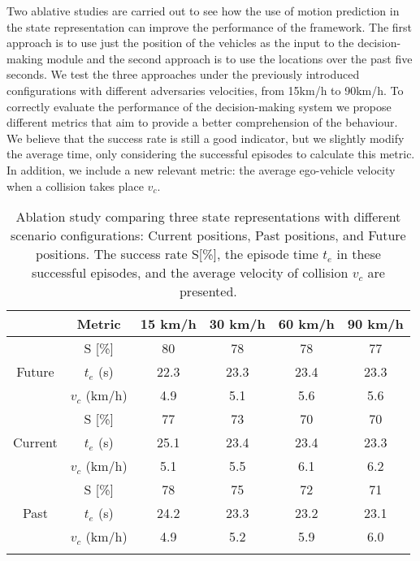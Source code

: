 Two ablative studies are carried out to see how the use of motion prediction in the state representation can improve the performance of the framework. The first approach is to use just the position of the vehicles as the input to the decision-making module and the second approach is to use the locations over the past five seconds. We test the three approaches under the previously introduced configurations with different adversaries velocities, from 15km/h to 90km/h. To correctly evaluate the performance of the decision-making system we propose different metrics that aim to provide a better comprehension of the behaviour. We believe that the success rate is still a good indicator, but we slightly modify the average time, only considering the successful episodes to calculate this metric. In addition, we include a new relevant metric: the average ego-vehicle velocity when a collision takes place $v_{c}$.  

\begin{table}[]
	\centering
	\captionsetup{justification=justified}
	\caption[Ablation study comparing three state representations with different scenario configurations]{Ablation study comparing three state representations with different scenario configurations: Current positions, Past positions, and Future positions. The success rate S[\%], the episode time $t_{e}$ in these successful episodes, and the average velocity of collision $v_{c}$ are presented.}
	\label{table:chapter_8_Applications/dm_ablation_study_smarts}
	\setlength{\extrarowheight}{2pt}
	\begin{tabular}{cccccc} 
		\ChangeRT{1pt}
		& Metric & 15 km/h & 30 km/h & 60 km/h & 90 km/h  \\
		\hline 
		\multirow{3}{*}{Future}
		&S [\%] & 80 & 78 & 78 & 77 \\ 
		&$t_{e}$ (s) & 22.3 & 23.3 & 23.4 & 23.3 \\
		&$v_{c}$ (km/h) & 4.9 & 5.1 & 5.6 & 5.6 \\
		\hline
		\multirow{3}{*}{Current}
		&S [\%] & 77 & 73 & 70 & 70 \\ 
		&$t_{e}$ (s) & 25.1 & 23.4 & 23.4 & 23.3 \\
		&$v_{c}$ (km/h) & 5.1 & 5.5 & 6.1 & 6.2 \\
		\hline
		\multirow{3}{*}{Past}
		&S [\%] & 78 & 75 & 72 & 71 \\ 
		&$t_{e}$ (s) & 24.2 & 23.3 & 23.2 & 23.1 \\
		&$v_{c}$ (km/h) & 4.9 & 5.2 & 5.9 & 6.0 \\
		\hline
		\ChangeRT{1pt}
	\end{tabular}
\end{table}


